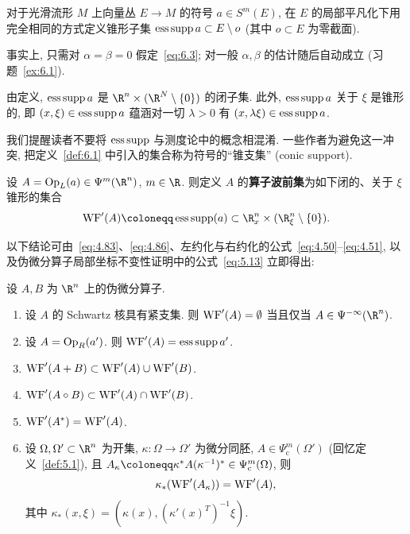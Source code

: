 对于光滑流形 $M$ 上向量丛 $E \to M$ 的符号 $a \in S^m(E)$, 在 $E$ 的局部平凡化下用完全相同的方式定义锥形子集 $\operatorname{ess\,supp} a \subset E \setminus o$ (其中 $o \subset E$ 为零截面).

事实上, 只需对 $\alpha = \beta = 0$ 假定~\eqref{eq:6.3}; 对一般 $\alpha, \beta$ 的估计随后自动成立 (习题~\ref{ex:6.1}).

由定义, $\operatorname{ess\,supp} a$ 是 $\R^n \times (\R^N \setminus \{0\})$ 的闭子集. 此外, $\operatorname{ess\,supp} a$ 关于 $\xi$ 是锥形的, 即 $(x, \xi) \in \operatorname{ess\,supp} a$ 蕴涵对一切 $\lambda > 0$ 有 $(x, \lambda \xi) \in \operatorname{ess\,supp} a$.

\begin{remark}[术语]\label{rem:6.2}
我们提醒读者不要将 $\operatorname{ess\,supp}$ 与测度论中的概念相混淆. 一些作者为避免这一冲突, 把定义~\ref{def:6.1} 中引入的集合称为符号的``锥支集'' (conic support).
\end{remark}

\begin{definition}[算子波前集: $\R^n$ 情形]\label{def:6.3}
设 $A = \OpL(a) \in \Psi^m(\R^n)$, $m \in \R$. 则定义 $A$ 的\textbf{算子波前集}为如下闭的、关于 $\xi$ 锥形的集合
\begin{equation}\label{eq:6.4}
    \WF'(A) \defeq \esupp(a) \subset \R^n_x \times (\R^n_\xi \setminus \{0\}).
\end{equation}
\end{definition}

以下结论可由~\eqref{eq:4.83}、\eqref{eq:4.86}、左约化与右约化的公式~\eqref{eq:4.50}--\eqref{eq:4.51}, 以及伪微分算子局部坐标不变性证明中的公式~\eqref{eq:5.13} 立即得出:

\begin{proposition}[算子波前集的性质]\label{prop:6.4}
设 $A, B$ 为 $\R^n$ 上的伪微分算子.
\begin{enumerate}
    \item 设 $A$ 的 Schwartz 核具有紧支集. 则 $\operatorname{WF}'(A) = \emptyset$ 当且仅当 $A \in \Psi^{-\infty}(\R^n)$.
    \item 设 $A = \operatorname{Op}_R(a')$. 则 $\operatorname{WF}'(A) = \operatorname{ess\,supp} a'$.
    \item $\operatorname{WF}'(A + B) \subset \operatorname{WF}'(A) \cup \operatorname{WF}'(B)$.
    \item $\operatorname{WF}'(A \circ B) \subset \operatorname{WF}'(A) \cap \operatorname{WF}'(B)$.
    \item $\operatorname{WF}'(A^*) = \operatorname{WF}'(A)$.
    \item 设 $\Omega, \Omega' \subset \R^n$ 为开集, $\kappa \colon \Omega \to \Omega'$ 为微分同胚, $A \in \Psi_{\mathrm{c}}^m(\Omega')$ (回忆定义~\ref{def:5.1}), 且 $A_\kappa \defeq \kappa^* A (\kappa^{-1})^* \in \Psi_{\mathrm{c}}^m(\Omega)$, 则
    \begin{equation}\label{eq:6.5}
        \kappa_*(\operatorname{WF}'(A_\kappa)) = \operatorname{WF}'(A),
    \end{equation}
    其中 $\kappa_*(x, \xi) = (\kappa(x), (\kappa'(x)^T)^{-1}\xi)$.
\end{enumerate}
\end{proposition}

